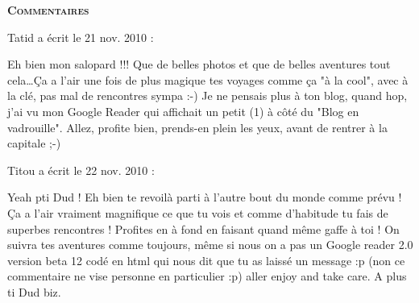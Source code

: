 \bigskip
\textbf{\textsc{Commentaires}}

\medskip
Tatid a écrit le 21 nov. 2010 :
\begin{displayquote}
Eh bien mon salopard !!! Que de belles photos et que de belles aventures tout cela\dots Ça a l'air une fois de plus magique tes voyages comme ça "à la cool", avec à la clé, pas mal de rencontres sympa :-)
Je ne pensais plus à ton blog, quand hop, j'ai vu mon Google Reader qui affichait un petit (1) à côté du "Blog en vadrouille".
Allez, profite bien, prends-en plein les yeux, avant de rentrer à la capitale ;-)
\end{displayquote}

\medskip
Titou a écrit le 22 nov. 2010 :
\begin{displayquote}
Yeah pti Dud !
Eh bien te revoilà parti à l'autre bout du monde comme prévu ! Ça a l'air vraiment magnifique ce que tu vois et comme d'habitude tu fais de superbes rencontres ! Profites en à fond en faisant quand même gaffe à toi ! On suivra tes aventures comme toujours, même si nous on a pas un Google reader 2.0 version beta 12 codé en html qui nous dit que tu as laissé un message :p
(non ce commentaire ne vise personne en particulier :p)
aller enjoy and take care.
A plus ti Dud
biz.
\end{displayquote}

\vfill
